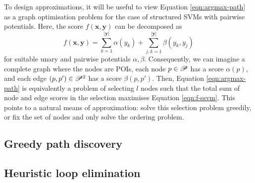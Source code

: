 
To design approximations, it will be useful to view Equation \ref{eqn:argmax-path} as a graph optimisation problem
for the case of structured SVMs with pairwise potentials.
Here, the score $f(\mathbf{x}, \mathbf{y})$ can be decomposed as
\begin{equation}
	\label{eqn:f-ssvm}
	f(\mathbf{x}, \mathbf{y}) = \sum_{k = 1}^{|\mathbf{y}|} \alpha( y_k ) + \sum_{j, k = 1}^{|\mathbf{y}|} \beta( y_k, y_j )
\end{equation}
for suitable unary and pairwise potentials $\alpha, \beta$.
Consequently, we can imagine a complete graph where the nodes are POIs, each node $p \in \mathscr{P}$ has a score $\alpha( p )$, and each edge $(p, p') \in \mathscr{P}^2$ has a score $\beta( p, p' )$.
Then, Equation \ref{eqn:argmax-path} is equivalently a problem of selecting $l$ nodes such that
the total sum of node and edge scores in the selection maximises Equation \ref{eqn:f-ssvm}.
This points to a natural means of approximation: solve this selection problem greedily, or fix the set of nodes and only solve the ordering problem.

\subsection{Greedy path discovery}
\label{sec:greedy}


\subsection{Heuristic loop elimination}
\label{sec:loop-elim}


% 
